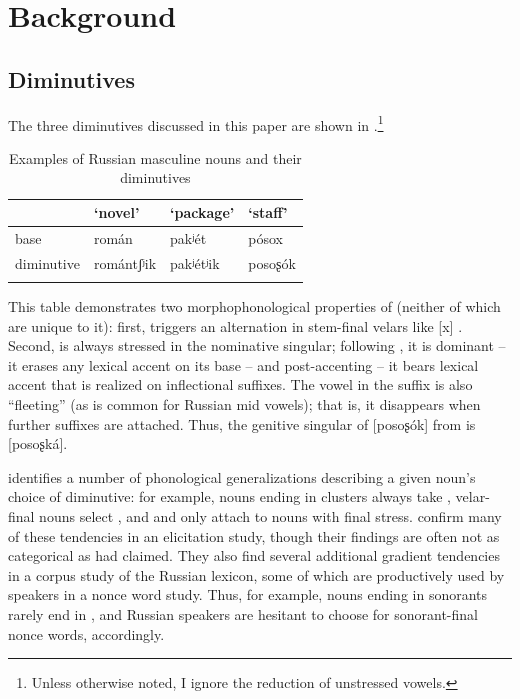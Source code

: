 \documentclass[output=paper,colorlinks,citecolor=brown
]{langscibook}
\begin{document}

\section{Background}\label{sec:bg}
\subsection{Diminutives}\label{sec:dimbg}
The three diminutives discussed in this paper are shown in .\footnote{Unless otherwise noted, I ignore the reduction of unstressed vowels.}
\begin{table}
\begin{tabular}{llll}
\lsptoprule
& `novel' & `package' & `staff'\\
\midrule
base & román & pakʲét & pósox\\
diminutive & romántʃʲik & pakʲétʲik & posoʂók\\
\lspbottomrule
\end{tabular}
\caption{Examples of Russian masculine nouns and their diminutives}
\label{tab:dimex}
\end{table}
This table demonstrates two morphophonological properties of \ok{} (neither of which are unique to it): first, \ok{} triggers an alternation in stem-final velars like [x] \citep[see][]{Kapatsinski2010,Magomedova.Slioussar2017}. Second, \ok{} is always stressed in the nominative singular; following \citet{Melvold1989}, it is dominant -- it erases any lexical accent on its base -- and post-accenting -- it bears lexical accent that is realized on inflectional suffixes. The vowel in the suffix is also ``fleeting'' (as is common for Russian mid vowels); that is, it disappears when further suffixes are attached. Thus, the genitive singular of [posoʂók] from  is [posoʂká].

\citet{Polivanova2008} identifies a number of phonological generalizations describing a given noun's choice of diminutive: for example, nouns ending in clusters always take \ik{}, velar-final nouns select \ok{}, and \chik{} and \ik{} only attach to nouns with final stress. \citet{Gouskova.etal2015} confirm many of these tendencies in an elicitation study, though their findings are often not as categorical as \citet{Polivanova2008} had claimed. They also find several additional gradient tendencies in a corpus study of the Russian lexicon, some of which are productively used by speakers in a nonce word study. Thus, for example, nouns ending in sonorants rarely end in \ik{}, and Russian speakers are hesitant to choose \ik{} for sonorant-final nonce words, accordingly.
\end{document}
